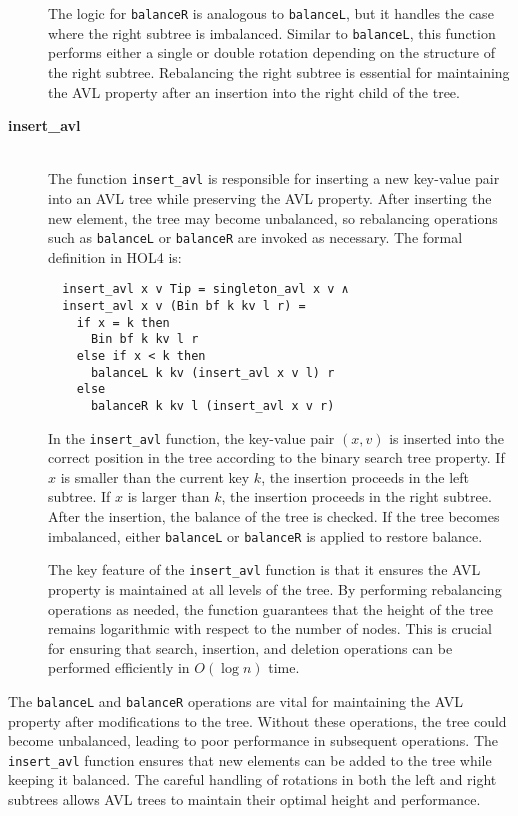 \documentclass[12pt]{article}
\begin{document}
\begin{description}
  The logic for \texttt{balanceR} is analogous to \texttt{balanceL}, but it handles the case where the right subtree is imbalanced. Similar to \texttt{balanceL}, this function performs either a single or double rotation depending on the structure of the right subtree. Rebalancing the right subtree is essential for maintaining the AVL property after an insertion into the right child of the tree.

  \item[\textbf{insert\_avl}] \\
  The function \texttt{insert\_avl} is responsible for inserting a new key-value pair into an AVL tree while preserving the AVL property. After inserting the new element, the tree may become unbalanced, so rebalancing operations such as \texttt{balanceL} or \texttt{balanceR} are invoked as necessary. The formal definition in HOL4 is:
  \begin{verbatim}
  insert_avl x v Tip = singleton_avl x v ∧  
  insert_avl x v (Bin bf k kv l r) =
    if x = k then
      Bin bf k kv l r  
    else if x < k then
      balanceL k kv (insert_avl x v l) r  
    else
      balanceR k kv l (insert_avl x v r)
  \end{verbatim}

  In the \texttt{insert\_avl} function, the key-value pair \( (x, v) \) is inserted into the correct position in the tree according to the binary search tree property. If \( x \) is smaller than the current key \( k \), the insertion proceeds in the left subtree. If \( x \) is larger than \( k \), the insertion proceeds in the right subtree. After the insertion, the balance of the tree is checked. If the tree becomes imbalanced, either \texttt{balanceL} or \texttt{balanceR} is applied to restore balance.

  The key feature of the \texttt{insert\_avl} function is that it ensures the AVL property is maintained at all levels of the tree. By performing rebalancing operations as needed, the function guarantees that the height of the tree remains logarithmic with respect to the number of nodes. This is crucial for ensuring that search, insertion, and deletion operations can be performed efficiently in \( O(\log n) \) time.

\end{description}

The \texttt{balanceL} and \texttt{balanceR} operations are vital for maintaining the AVL property after modifications to the tree. Without these operations, the tree could become unbalanced, leading to poor performance in subsequent operations. The \texttt{insert\_avl} function ensures that new elements can be added to the tree while keeping it balanced. The careful handling of rotations in both the left and right subtrees allows AVL trees to maintain their optimal height and performance.
\end{document}
